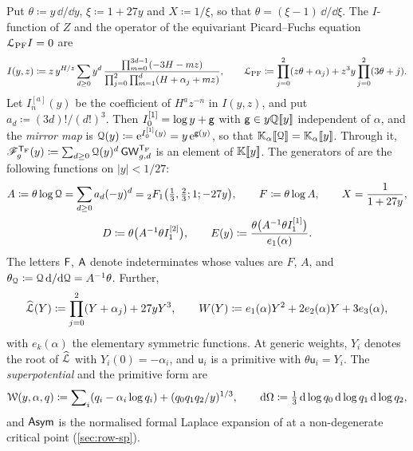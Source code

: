 Put $\theta\coloneqq y\,\dd/\dd y$, $\xi\coloneqq1+27y$ and $X\coloneqq1/\xi$, so that $\theta=(\xi-1)\,\dd/\dd\xi$. The $I$-function of $Z$ and the operator of the equivariant Picard--Fuchs equation $\mathcal{L}_{\mathrm{PF}} I=0$ are
\begin{equation}
\label{eq:set-I}
I(y,z)\coloneqq z\,y^{H/z}\sum_{d\geq0}y^d\,\frac{\prod_{m=0}^{3d-1}(-3H-mz)}{\prod_{j=0}^{2}\prod_{m=1}^{d}(H+\alpha_j+mz)},\qquad
\mathcal{L}_{\mathrm{PF}}\coloneqq\prod_{j=0}^{2}(z\theta+\alpha_j)+z^3y\prod_{j=0}^{2}(3\theta+j).
\end{equation}
Let $I^{[a]}_n(y)$ be the coefficient of $H^az^{-n}$ in $I(y,z)$, and put $a_d\coloneqq(3d)!/(d!)^3$. Then $I_0^{[1]}=\log y+\mathsf{g}$ with $\mathsf{g}\in y\mathbb{Q}[\![ y ]\!]$ independent of $\alpha$, and the \emph{mirror map} is $\mathcal{Q}(y)\coloneqq\mathrm{e}^{I_0^{[1]}(y)}=y\,\mathrm{e}^{\mathsf{g}(y)}$, so that $\mathbb{K}_{\alpha}[\![ \mathcal{Q} ]\!]=\mathbb{K}_{\alpha}[\![ y ]\!]$. Through it, $\mathscr{F}_g^{\mathsf{T}_{\mathrm{F}}}(y)\coloneqq\sum_{d\geq0}\mathcal{Q}(y)^d\,\mathsf{GW}_{g,d}^{\mathsf{T}_{\mathrm{F}}}$ is an element of $\mathbb{K}[\![ y ]\!]$. The generators of \cite{BS} are the following functions on $|y|<1/27$:
\begin{equation}
\label{eq:set-gens}
\begin{gathered}
A\coloneqq\theta\log\mathcal{Q}=\sum_{d\geq0}a_d(-y)^d={}_2F_1\big(\tfrac13,\tfrac23;1;-27y\big),\qquad F\coloneqq\theta\log A,\qquad X=\frac{1}{1+27y},\\
D\coloneqq\theta\big(A^{-1}\theta I_1^{[2]}\big),\qquad
E(y)\coloneqq\frac{\theta\big(A^{-1}\theta I_1^{[1]}\big)}{e_1(\alpha)}.
\end{gathered}
\end{equation}
The letters $\mathsf{F}$, $\mathsf{A}$ denote indeterminates whose values are $F$, $A$, and $\theta_{\mathcal{Q}}\coloneqq\mathcal{Q}\,\mathrm{d}/\mathrm{d}\mathcal{Q}=A^{-1}\theta$. Further,
\begin{equation}
\label{eq:set-LW}
\widehat{\mathcal{L}}(Y)\coloneqq\prod_{j=0}^{2}(Y+\alpha_j)+27yY^3,\qquad W(Y)\coloneqq e_1(\alpha)Y^2+2e_2(\alpha)Y+3e_3(\alpha),
\end{equation}
with $e_k(\alpha)$ the elementary symmetric functions. At generic weights, $Y_i$ denotes the root of $\widehat{\mathcal{L}}$ with $Y_i(0)=-\alpha_i$, and $\mathsf{u}_i$ is a primitive with $\theta\mathsf{u}_i=Y_i$. The \emph{superpotential} and the primitive form are
\begin{equation}
\label{eq:set-spot}
\mathcal{W}(y,\alpha,q)\coloneqq\sum\nolimits_{i}(q_i-\alpha_i\log q_i)+(q_0q_1q_2/y)^{1/3},\qquad
\mathrm{d}\Omega\coloneqq\tfrac13\,\mathrm{d}\log q_0\,\mathrm{d}\log q_1\,\mathrm{d}\log q_2,
\end{equation}
and $\mathsf{Asym}$ is the normalised formal Laplace expansion of \cite{BS} at a non-degenerate critical point (\cref{sec:row-sp}).

